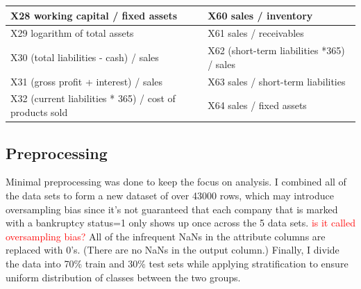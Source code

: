 \documentclass{article}
\newcommand\todo[1]{\textcolor{red}{#1}}
\begin{document}
\begin{table}
\begin{tabular}{| l | l |}
		X28 working capital / fixed assets                                                                                                                                 & X60 sales / inventory                                                                                                                        \\ \hline
		X29 logarithm of total assets                                                                                                                                      & X61 sales / receivables                                                                                                                      \\ \hline
		X30 (total liabilities - cash) / sales                                                                                                                             & X62 (short-term liabilities *365) / sales                                                                                                    \\ \hline
		X31 (gross profit + interest) / sales                                                                                                                              & X63 sales / short-term liabilities                                                                                                           \\ \hline
		X32 (current liabilities * 365) / cost of products sold                                                                                                            & X64 sales / fixed assets
		\\
		\hline                                                                                                    
	\end{tabular}
\end{table}

\subsection{Preprocessing}

Minimal preprocessing was done to keep the focus on analysis. I combined all of the data sets to form a new dataset of over 43000 rows, which may introduce oversampling bias since it's not guaranteed that each company that is marked with a bankruptcy status=1 only shows up once across the 5 data sets. \todo{is it called oversampling bias?} All of the infrequent NaNs in the attribute columns are replaced with 0's. (There are no NaNs in the output column.) Finally, I divide the data into 70\% train and 30\% test sets while applying stratification to ensure uniform distribution of classes between the two groups. 
\end{document}
